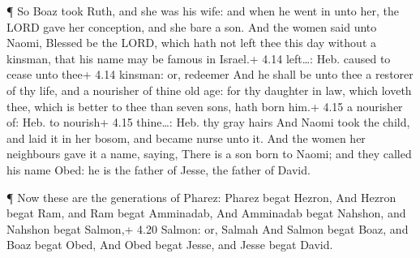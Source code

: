  ¶ So Boaz took Ruth, and she was his wife: and when he
went in unto her, the LORD gave her conception, and she bare a son.
 And the women said unto Naomi, Blessed be the LORD, which
hath not left thee this day without a kinsman, that his name may be
famous in Israel.+ 4.14 left\ldots: Heb. caused to cease unto thee+ 4.14
kinsman: or, redeemer  And he shall be unto thee a restorer
of thy life, and a nourisher of thine old age: for thy daughter in law,
which loveth thee, which is better to thee than seven sons, hath born
him.+ 4.15 a nourisher of: Heb. to nourish+ 4.15 thine\ldots: Heb. thy
gray hairs  And Naomi took the child, and laid it in her
bosom, and became nurse unto it.  And the women her
neighbours gave it a name, saying, There is a son born to Naomi; and
they called his name Obed: he is the father of Jesse, the father of
David.

 ¶ Now these are the generations of Pharez: Pharez begat
Hezron,  And Hezron begat Ram, and Ram begat Amminadab,
 And Amminadab begat Nahshon, and Nahshon begat Salmon,+
4.20 Salmon: or, Salmah  And Salmon begat Boaz, and Boaz
begat Obed,  And Obed begat Jesse, and Jesse begat David.
